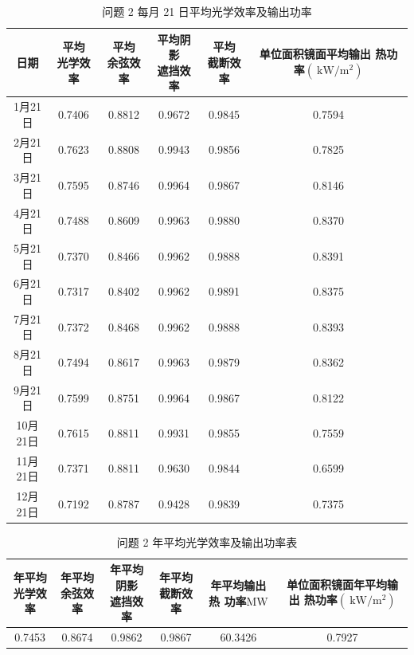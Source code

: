 \documentclass{article}
\numberwithin{equation}{subsection}
\begin{document}
\begin{table}[!htbp]
    \centering
    \begin{tabular}{|c|c|c|c|c|c|}\hline
        日期&\makecell[c]{平均\\光学效率}&\makecell[c]{平均\\余弦效率}&\makecell[c]{平均阴影\\遮挡效率}&\makecell[c]{平均\\截断效率}&\makecell[c]{单位面积镜面平均输出\\热功率$(\mathrm{~kW} / \mathrm{m}^2)$}\\\hline
        1月21日&	0.7406& 	0.8812& 	0.9672& 	0.9845& 	0.7594 \\\hline
        2月21日&	0.7623& 	0.8808& 	0.9943& 	0.9856& 	0.7825 \\\hline
        3月21日&	0.7595& 	0.8746& 	0.9964& 	0.9867& 	0.8146 \\\hline
        4月21日&	0.7488& 	0.8609& 	0.9963& 	0.9880& 	0.8370 \\\hline
        5月21日&	0.7370& 	0.8466& 	0.9962& 	0.9888& 	0.8391 \\\hline
        6月21日&	0.7317& 	0.8402& 	0.9962& 	0.9891& 	0.8375 \\\hline
        7月21日&	0.7372& 	0.8468& 	0.9962& 	0.9888& 	0.8393 \\\hline
        8月21日&	0.7494& 	0.8617& 	0.9963& 	0.9879& 	0.8362 \\\hline
        9月21日&	0.7599& 	0.8751& 	0.9964& 	0.9867& 	0.8122 \\\hline
        10月21日&	0.7615& 	0.8811& 	0.9931& 	0.9855& 	0.7559 \\\hline
        11月21日&	0.7371& 	0.8811& 	0.9630& 	0.9844& 	0.6599 \\\hline
        12月21日&	0.7192& 	0.8787& 	0.9428& 	0.9839& 	0.7375 \\\hline
    \end{tabular}
    \caption{问题 2 每月 21 日平均光学效率及输出功率}
\end{table}

\begin{table}[!htbp]
    \centering
    \begin{tabular}{|c|c|c|c|c|c|}\hline
        \makecell[c]{年平均\\光学效率}&\makecell[c]{年平均\\余弦效率}&\makecell[c]{年平均阴影\\遮挡效率}&\makecell[c]{年平均\\截断效率}&\makecell[c]{年平均输出热\\功率$\mathrm{MW}$}&\makecell[c]{单位面积镜面年平均输出\\热功率$(\mathrm{~kW} / \mathrm{m}^2)$}\\\hline
        0.7453& 	0.8674& 	0.9862& 	0.9867& 	60.3426& 	0.7927
        \\\hline
    \end{tabular}
    \caption{问题 2 年平均光学效率及输出功率表}
\end{table}
\end{document}
